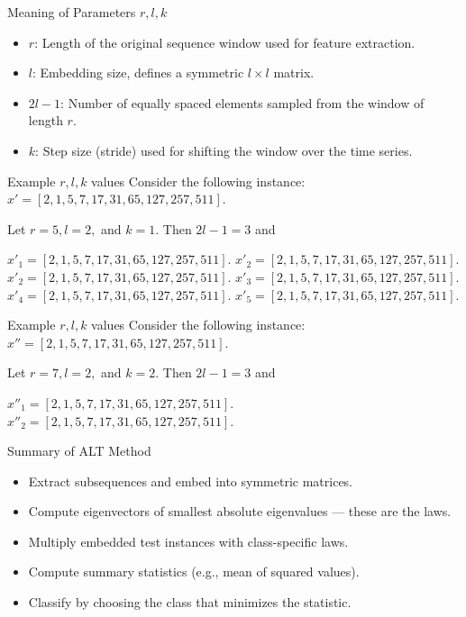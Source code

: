 \documentclass{beamer}
\begin{document}
\begin{frame}{Meaning of Parameters \( r, l, k \)}
  \begin{itemize}
    \item \( r \): Length of the original sequence window used for feature extraction.
    \item \( l \): Embedding size, defines a symmetric \( l \times l \) matrix.
    \item \( 2l - 1 \): Number of equally spaced elements sampled from the window of length \( r \).
    \item \( k \): Step size (stride) used for shifting the window over the time series.
  \end{itemize}
\end{frame}

\begin{frame}{Example \(r, l, k\) values}
    Consider the following instance: \(x' = [2, 1, 5, 7, 17, 31, 65, 127, 257, 511]\).
    
    Let \(r=5, l= 2, \) and \(k=1\). Then \(2l-1=3\) and
    \vspace{10px}
    
    \(x'_1 = [\boxed{\boxed{2}, 1, \boxed{5}, 7, \boxed{17}}, 31, 65, 127, 257, 511].\)
    \(x'_2 = [2, \boxed{\boxed{1}, 5, \boxed{7}, 17, \boxed{31}}, 65, 127, 257, 511].\)
    \(x'_2 = [2, 1, \boxed{\boxed{5}, 7, \boxed{17}, 31, \boxed{65}}, 127, 257, 511].\)
    \(x'_3 = [2, 1, 5, \boxed{\boxed{7}, 17, \boxed{31}, 65, \boxed{127}}, 257, 511].\)
    \(x'_4 = [2, 1, 5, 7, \boxed{\boxed{17}, 31, \boxed{65}, 127, \boxed{257}}, 511].\)
    \(x'_5 = [2, 1, 5, 7, 17, \boxed{\boxed{31}, 65, \boxed{127}, 257, \boxed{511}}].\)
    
\end{frame}

\begin{frame}{Example \(r, l, k\) values}
    Consider the following instance: \(x'' = [2, 1, 5, 7, 17, 31, 65, 127, 257, 511]\).
    
    Let \(r=7, l= 2, \) and \(k=2\). Then \(2l-1=3\) and
    \vspace{10px}
    
    \(x''_1 = [\boxed{\boxed{2}, 1, 5, \boxed{7}, 17, 31, \boxed{65}}, 127, 257, 511].\)
    \(x''_2 = [2, 1, \boxed{\boxed{5}, 7, 17, \boxed{31}, 65, 127, \boxed{257}}, 511].\)

    
\end{frame}

\begin{frame}{Summary of ALT Method}
  \begin{itemize}
    \item Extract subsequences and embed into symmetric matrices.
    \item Compute eigenvectors of smallest absolute eigenvalues — these are the laws.
    \item Multiply embedded test instances with class-specific laws.
    \item Compute summary statistics (e.g., mean of squared values).
    \item Classify by choosing the class that minimizes the statistic.
  \end{itemize}
\end{frame}
\end{document}
